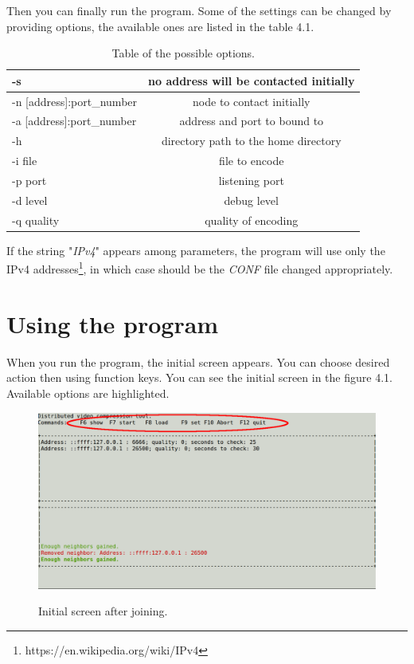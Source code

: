 Then you can finally run the program. Some of the settings can be changed by providing options, the available ones are listed in the table 4.1.

\begin{table}[h]
\begin{center}
 \begin{tabular}{ | l | c |}
   \hline
-s & no address will be contacted initially \\ \hline
-n [address]:port\_number & node to contact initially \\ \hline
-a [address]:port\_number & address and port to bound to \\ \hline
-h & directory path to the home directory \\ \hline
-i file & file to encode \\ \hline
-p port & listening port \\ \hline
-d level & debug level \\ \hline
-q quality & quality of encoding \\ \hline
 \end{tabular}
 \caption{Table of the possible options.}
 \end{center}
\end{table}

If the string "\textit{IPv4}" appears among parameters, the program will use only the IPv4 addresses\footnote{https://en.wikipedia.org/wiki/IPv4},
in which case should be the \textit{CONF} file changed appropriately.

\section{Using the program}
When you run the program, the initial screen appears. You can choose desired action then using function keys. You can see the initial screen in the figure 4.1. Available options are highlighted.
\begin{figure}[h]
\begin{center}
\includegraphics[scale=0.35]{./img/init-screen.pdf}
\label{initial-screen}
\caption[initial-screen]{Initial screen after joining.}
\end{center}
\end{figure}

